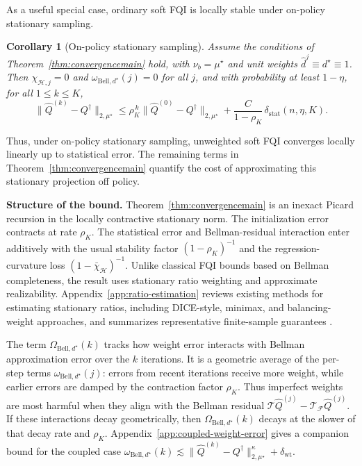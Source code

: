 \documentclass{article}
\theoremstyle{plain}
\newtheorem{corollary}{Corollary}
\theoremstyle{definition}
\theoremstyle{remark}
\begin{document}
 

As a useful special case, ordinary soft FQI is locally stable under
on-policy stationary sampling.

\begin{corollary}[On-policy stationary sampling]
\label{cor:on-policy-stationary}
Assume the conditions of Theorem~\ref{thm:convergencemain} hold, with
\(\nu_b=\mu^\star\) and unit weights \(\hat{d}^{j} \equiv d^\star\equiv 1\). Then
\(\chi_{\mathcal H,j}=0\) and \(\omega_{\mathrm{Bell},d^\star}(j)=0\) for all \(j\), and with probability at least
\(1-\eta\), for all \(1\le k\le K\),
\[
\bigl\|\widehat Q^{(k)} - Q^\dagger\bigr\|_{2,\mu^\star}
\le
\rho_K^{\,k}
\bigl\|\widehat Q^{(0)} - Q^\dagger\bigr\|_{2,\mu^\star}
+
\frac{C}{1-\rho_K}\,\delta_{\mathrm{stat}}(n,\eta,K).
\]
\end{corollary}

Thus, under on-policy stationary sampling, unweighted soft FQI converges locally
linearly up to statistical error. The remaining terms in
Theorem~\ref{thm:convergencemain} quantify the cost of approximating this
stationary projection off policy. 
 

\textbf{Structure of the bound.}
Theorem~\ref{thm:convergencemain} is an inexact Picard recursion in the locally
contractive stationary norm. The initialization error contracts at rate
\(\rho_K\). The statistical error and Bellman-residual interaction enter
additively with the usual stability factor \((1-\rho_K)^{-1}\) and the
regression-curvature loss \((1-\bar\chi_{\mathcal H})^{-1}\). Unlike classical
FQI bounds based on Bellman completeness, the result uses stationary ratio
weighting and approximate realizability. Appendix~\ref{app:ratio-estimation}
reviews existing methods for estimating stationary ratios, including DICE-style,
minimax, and balancing-weight approaches, and summarizes representative
finite-sample guarantees
\citep{uehara2020minimax,uehara2021finite}.


 
 



The term \(\Omega_{\mathrm{Bell},d^\star}(k)\) tracks how weight error interacts
with Bellman approximation error over the \(k\) iterations. It is a geometric
average of the per-step terms \(\omega_{\mathrm{Bell},d^\star}(j)\): errors from
recent iterations receive more weight, while earlier errors are damped by the
contraction factor \(\rho_K\). Thus imperfect weights are most harmful when
they align with the Bellman residual
\(\mathcal T\widehat Q^{(j)}-\mathcal T_{\mathcal F}\widehat Q^{(j)}\). If these
interactions decay geometrically, then \(\Omega_{\mathrm{Bell},d^\star}(k)\)
decays at the slower of that decay rate and \(\rho_K\). Appendix~\ref{app:coupled-weight-error}
gives a companion bound for the coupled case $\omega_{\mathrm{Bell},d^\star}(k)
\lesssim
\|\widehat Q^{(k)}-Q^\dagger\|_{2,\mu^\star}^{\kappa}
+\delta_{\mathrm{wt}} .$ 
\end{document}
